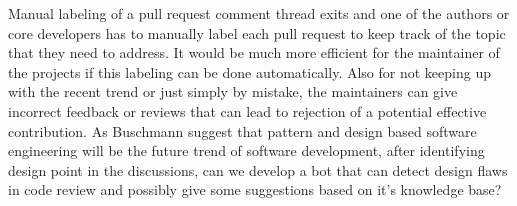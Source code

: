 Manual labeling of a pull request comment thread exits and one of the authors or core developers has to manually label each pull request to keep track of the topic that they need to address. It would be much more efficient for the maintainer of the projects if this labeling can be done automatically. Also for not keeping up with the recent trend or just simply by mistake, the maintainers can give incorrect feedback or reviews that can lead to rejection of a potential effective contribution. As Buschmann \cite{Buschmann2007} suggest that pattern and design based software engineering will be the future trend of software development, after identifying design point in the discussions, can we develop a bot that can detect design flaws in code review and possibly give some suggestions based on it's knowledge base?        


   
